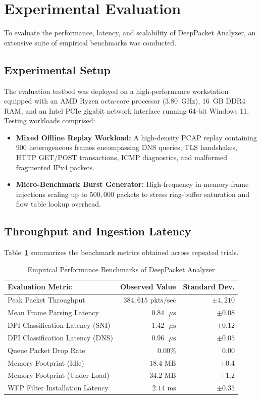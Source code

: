 \documentclass[conference]{IEEEtran}
\begin{document}
\section{Experimental Evaluation}
\label{sec:eval}
To evaluate the performance, latency, and scalability of DeepPacket Analyzer, an extensive suite of empirical benchmarks was conducted.

\subsection{Experimental Setup}
The evaluation testbed was deployed on a high-performance workstation equipped with an AMD Ryzen octa-core processor (3.80~GHz), 16~GB DDR4 RAM, and an Intel PCIe gigabit network interface running 64-bit Windows 11. Testing workloads comprised:
\begin{itemize}
    \item \textbf{Mixed Offline Replay Workload:} A high-density PCAP replay containing $900$ heterogeneous frames encompassing DNS queries, TLS handshakes, HTTP GET/POST transactions, ICMP diagnostics, and malformed fragmented IPv4 packets.
    \item \textbf{Micro-Benchmark Burst Generator:} High-frequency in-memory frame injections scaling up to $500,000$ packets to stress ring-buffer saturation and flow table lookup overhead.
\end{itemize}

\subsection{Throughput and Ingestion Latency}
Table~\ref{tab:benchmarks} summarizes the benchmark metrics obtained across repeated trials.

\begin{table}[h]
\centering
\caption{Empirical Performance Benchmarks of DeepPacket Analyzer}
\label{tab:benchmarks}
\begin{tabular}{@{}lrr@{}}
\toprule
\textbf{Evaluation Metric} & \textbf{Observed Value} & \textbf{Standard Dev.} \\
\midrule
Peak Packet Throughput & $384,615\text{ pkts/sec}$ & $\pm 4,210$ \\
Mean Frame Parsing Latency & $0.84\text{ }\mu\text{s}$ & $\pm 0.08$ \\
DPI Classification Latency (SNI) & $1.42\text{ }\mu\text{s}$ & $\pm 0.12$ \\
DPI Classification Latency (DNS) & $0.96\text{ }\mu\text{s}$ & $\pm 0.05$ \\
Queue Packet Drop Rate & $0.00\%$ & $0.00$ \\
Memory Footprint (Idle) & $18.4\text{ MB}$ & $\pm 0.4$ \\
Memory Footprint (Under Load) & $34.2\text{ MB}$ & $\pm 1.2$ \\
WFP Filter Installation Latency & $2.14\text{ ms}$ & $\pm 0.35$ \\
\bottomrule
\end{tabular}
\end{table}
\end{document}

